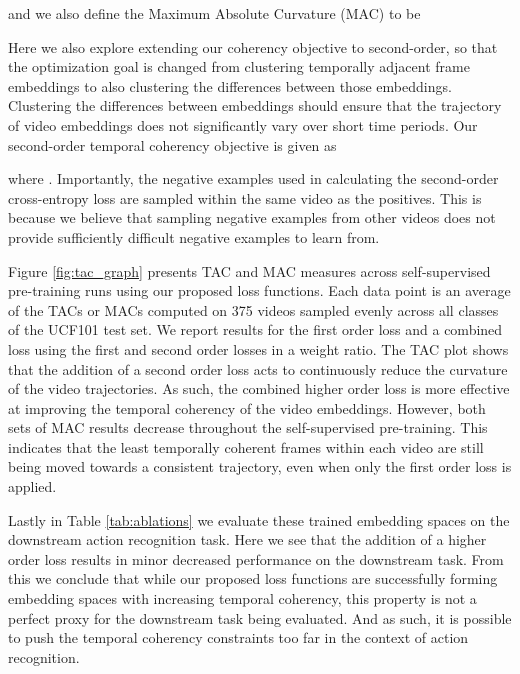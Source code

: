 \documentclass[a4paper,conference]{IEEEtran}
\begin{document}
and we also define the Maximum Absolute Curvature (MAC) to be



Here we also explore extending our coherency objective to second-order, so that the optimization goal is changed from clustering temporally adjacent frame embeddings to also clustering the differences between those embeddings. Clustering the differences between embeddings should ensure that the trajectory of video embeddings does not significantly vary over short time periods. Our second-order temporal coherency objective is given as




where . Importantly, the negative examples used in calculating the second-order cross-entropy loss are sampled within the same video as the positives. This is because we believe that sampling negative examples from other videos does not provide sufficiently difficult negative examples to learn from.

Figure \ref{fig:tac_graph} presents TAC and MAC measures across self-supervised pre-training runs using our proposed loss functions. Each data point is an average of the TACs or MACs computed on 375 videos sampled evenly across all classes of the UCF101 test set. We report results for the first order loss and a combined loss using the first and second order losses in a  weight ratio. The TAC plot shows that the addition of a second order loss acts to continuously reduce the curvature of the video trajectories. As such, the combined higher order loss is more effective at improving the temporal coherency of the video embeddings. However, both sets of MAC results decrease throughout the self-supervised pre-training. This indicates that the least temporally coherent frames within each video are still being moved towards a consistent trajectory, even when only the first order loss is applied.

Lastly in Table \ref{tab:ablations} we evaluate these trained embedding spaces on the downstream action recognition task. Here we see that the addition of a higher order loss results in minor decreased performance on the downstream task. From this we conclude that while our proposed loss functions are successfully forming embedding spaces with increasing temporal coherency, this property is not a perfect proxy for the downstream task being evaluated. And as such, it is possible to push the temporal coherency constraints too far in the context of action recognition.
\end{document}
